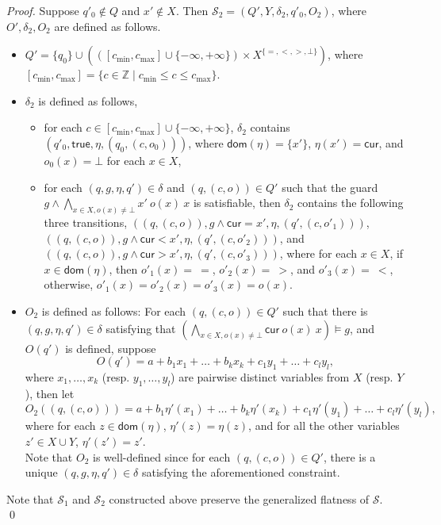 \documentclass[runningheads,a4paper]{llncs}
\def\Ss{{\mathcal{S} }}
\newcommand\intnum{{\mathbb{Z} }}
\newcommand\cur{\mathsf{cur}}
\newcommand\dom{\mathsf{dom}}
\newcommand\ltrue{\mathsf{true}}
\begin{document}
\begin{appendix}
\begin{proof}
Suppose $q'_{0} \not \in Q$ and $x' \not \in X$. Then $\Ss_2 = (Q', Y, \delta_2, q'_{0}, O_2)$, where $O',\delta_2,O_2$ are defined as follows. 
\begin{itemize}
\item $Q' = \{q_0\} \cup \left(\left([c_{\min}, c_{\max}] \cup \{-\infty,+\infty\}\right) \times X^{\{=, <, >,\bot\}} \right)$, where $[c_{\min},c_{\max}]= \{c \in \intnum \mid c_{\min} \le c \le c_{\max} \}$.
%
\item $\delta_2$ is defined as follows, 
\begin{itemize}
\item for each $c \in [c_{\min}, c_{\max}] \cup \{-\infty,+\infty\}$, $\delta_2$ contains $(q'_0,\ltrue,\eta, (q_0,(c, o_0)))$, where $\dom(\eta)=\{x'\}$, $\eta(x')=\cur$, and $o_0(x) = \bot$ for each $x \in X$,
%
\item for each $(q,g,\eta,q') \in \delta$ and $(q,(c,o)) \in Q'$ such that the guard $g \wedge \bigwedge \limits_{x \in X, o(x) \neq \bot} x'\ o(x)\ x$ is satisfiable, then $\delta_2$ contains the following three transitions, 
$((q,(c,o)), g \wedge \cur = x', \eta, (q',(c,o'_1)))$, $((q,(c,o)), g \wedge \cur< x', \eta, (q',(c,o'_2)))$, and $((q,(c,o)), g \wedge \cur > x', \eta, (q',(c,o'_3)))$, 
where 
for each $x \in X$, if $x \in \dom(\eta)$, then $o'_1(x) = \ =$, $o'_2(x)=\ >$, and $o'_3(x) =\ <$, otherwise, $o'_1(x) = o'_2(x) = o'_3(x) = o(x)$.
\end{itemize}
%
\item $O_2$ is defined as follows: For each $(q,(c,o)) \in Q'$  such that there is $(q,g,\eta,q') \in \delta$ satisfying that $\left(\bigwedge \limits_{x \in X, o(x) \neq \bot} \cur\ o(x)\ x \right) \models g$, and $O(q')$ is defined, suppose 
\[O(q')=a+b_1 x_1 + \dots + b_k x_k + c_1 y_1 + \dots + c_l y_l,\]
where $x_1,\dots,x_k$ (resp. $y_1,\dots,y_l$) are pairwise distinct variables from $X$ (resp. $Y$),
then let
\[O_2((q,(c,o)))=a+b_1 \eta'(x_1) + \dots + b_k \eta'(x_k) + c_1 \eta'(y_1) + \dots + c_l \eta'(y_l),\]
where for each $z \in \dom(\eta)$, $\eta'(z)=\eta(z)$, and for all the other variables $z' \in X \cup Y$, $\eta'(z')=z'$.  \\
Note that $O_2$ is well-defined since for each $(q,(c,o)) \in Q'$, there is a unique $(q,g,\eta,q') \in \delta$ satisfying the aforementioned constraint.
\end{itemize}
%
Note that $\Ss_1$ and $\Ss_2$ constructed above preserve the generalized flatness of $\Ss$.
\qed
\end{proof}



\end{appendix}
\end{document}
